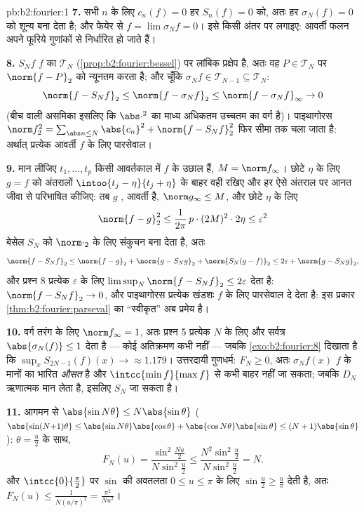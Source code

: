 \begin{solution}{pb:b2:fourier:1}
\textbf{7.} सभी $n$ के लिए $c_n(f) = 0$ हर $S_n(f) = 0$ को, अतः हर $\sigma_N(f) = 0$ को शून्य बना देता है;
और फेयेर से $f = \lim\sigma_Nf =
0$। इसे किसी अंतर पर लगाइए:  आवर्ती फलन अपने फूरिये
गुणांकों से निर्धारित हो जाते हैं।

\textbf{8.} $S_Nf$ $f$ का $\mathcal T_N$ (\cref{prop:b2:fourier:bessel}) पर लांबिक प्रक्षेप है, अतः वह $P \in \mathcal T_N$ पर $\norm{f - P}_2$
को न्यूनतम करता है; और चूँकि $\sigma_Nf
\in \mathcal T_{N-1} \subseteq \mathcal T_N$:
\[
\norm{f - S_Nf}_2 \leq \norm{f - \sigma_Nf}_2
\leq \norm{f - \sigma_Nf}_\infty \to 0
\]
(बीच वाली असमिका इसलिए कि $\abs\cdot^2$ का माध्य अधिकतम उच्चतम का वर्ग है)।
पाइथागोरस $\norm f_2^2 = \sum_{\abs
n\leq N}\abs{c_n}^2 + \norm{f - S_Nf}_2^2$ फिर सीमा तक चला जाता है: अर्थात् प्रत्येक  आवर्ती $f$
के लिए पारसेवाल।

\textbf{9.} मान लीजिए $t_1, \dots, t_p$ किसी आवर्तकाल में $f$ के उछाल हैं, $M = \norm f_\infty$। छोटे $\eta$
के लिए $g = f$ को अंतरालों $\intoo{t_j - \eta}{t_j + \eta}$ के बाहर वही रखिए और हर ऐसे अंतराल पर आनत जीवा
से परिभाषित कीजिए: तब $g$ , आवर्ती है, $\norm g_\infty \leq M$, और छोटे $\eta$ के लिए
\[
\norm{f - g}_2^2 \leq \frac{1}{2\pi}\,p\cdot(2M)^2\cdot2\eta
\leq \varepsilon^2
\]
बेसेल $S_N$ को $\norm\cdot_2$ के लिए संकुचन बना देता है, अतः
\[
\norm{f - S_Nf}_2
\leq \norm{f - g}_2 + \norm{g - S_Ng}_2 + \norm{S_N(g -
f)}_2
\leq 2\varepsilon + \norm{g - S_Ng}_2 ,
\]
और प्रश्न 8 प्रत्येक $\varepsilon$ के लिए $\limsup_N\norm{f - S_Nf}_2 \leq
2\varepsilon$ देता है: $\norm{f - S_Nf}_2 \to
0$, और पाइथागोरस प्रत्येक
खंडशः  $f$ के लिए पारसेवाल दे देता है: इस प्रकार \cref{thm:b2:fourier:parseval} का ``स्वीकृत''
अब प्रमेय है।

\textbf{10.} वर्ग तरंग के लिए $\norm f_\infty = 1$, अतः प्रश्न 5 प्रत्येक $N$ के लिए और
सर्वत्र $\abs{\sigma_N(f)} \leq 1$ देता है --- कोई अतिक्रमण कभी नहीं --- जबकि \cref{exo:b2:fourier:8} दिखाता है कि
$\sup_xS_{2N-1}(f)(x) \to
\approx 1.179$। उत्तरदायी गुणधर्म: $F_N \geq 0$, अतः $\sigma_Nf(x)$ $f$ के मानों का भारित \emph{औसत} है
और $\intcc{\min f}{\max f}$ से कभी बाहर नहीं जा सकता; जबकि $D_N$ ऋणात्मक मान लेता है, इसलिए $S_N$
जा सकता है।

\textbf{11.} आगमन से $\abs{\sin N\theta} \leq N\abs{\sin\theta}$ ($\abs{\sin(N{+}1)\theta} \leq
\abs{\sin N\theta}\abs{\cos\theta} +
\abs{\cos N\theta}\abs{\sin\theta} \leq
(N+1)\abs{\sin\theta}$): $\theta = \frac u2$ के साथ,
\[
F_N(u) = \frac{\sin^2\frac{Nu}2}{N\sin^2\frac u2}
\leq \frac{N^2\sin^2\frac u2}{N\sin^2\frac u2} = N .
\]
और $\intcc{0}{\frac\pi2}$ पर $\sin$ की अवतलता $0 \leq u \leq \pi$ के लिए $\sin\frac u2 \geq \frac{u}{\pi}$ देती है, अतः $F_N(u) \leq \frac{1}{N(u/\pi)^2} = \frac{\pi^2}{Nu^2}$।


\end{solution}
